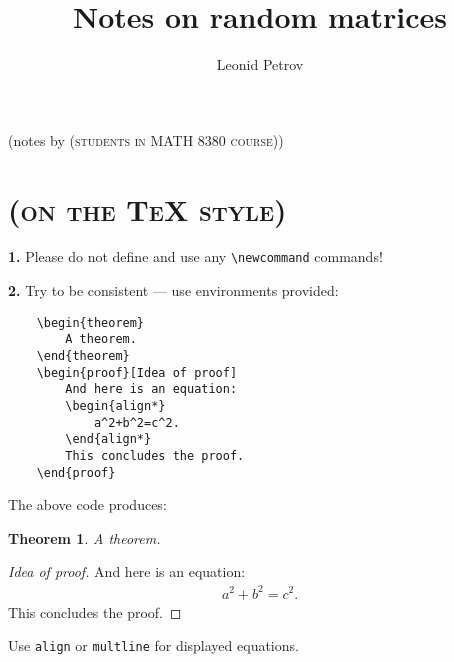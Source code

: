\documentclass[letterpaper,11pt,oneside,reqno]{amsart}
\numberwithin{equation}{section}%
\newcommand{\note}[1]{\textsc{\color{blue}(#1)}}
\newtheorem{theorem}[proposition]{Theorem}
\theoremstyle{definition}
\begin{document}
\title[Notes on random matrices]{Notes on random matrices}

\author[L. Petrov]{Leonid Petrov}
\address{L. Petrov, Department of Mathematics, University of Virginia, 
141 Cabell Drive, Kerchof Hall,
P.O. Box 400137,
Charlottesville, VA 22904, USA,
\newline{}and Institute for Information Transmission Problems, Bolshoy Karetny per. 19, Moscow, 127994, Russia}
\date{}
\maketitle

\begin{center}
	(notes by \note{students in MATH 8380 course})
\end{center}

\tableofcontents
\setcounter{tocdepth}{3}

\section*{\note{on the \TeX{} style}}

\lstset{basicstyle=\footnotesize\ttfamily,language=TeX} 

\textbf{1.} Please do not define and use any \lstinline{\newcommand} commands!

\textbf{2.} Try to be consistent --- use environments provided:
\begin{lstlisting}
	\begin{theorem}
		A theorem.		
	\end{theorem}
	\begin{proof}[Idea of proof]
		And here is an equation:
		\begin{align*}
			a^2+b^2=c^2.
		\end{align*}
		This concludes the proof.
	\end{proof}	
\end{lstlisting}
The above code produces:
\begin{theorem}
	A theorem.		
\end{theorem}
\begin{proof}[Idea of proof]
	And here is an equation:
	\begin{align*}
		a^2+b^2=c^2.
	\end{align*}
	This concludes the proof.
\end{proof}
Use \lstinline{align} or \lstinline{multline} for displayed equations.
\end{document}
